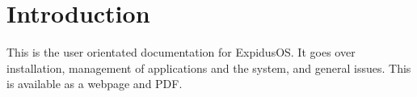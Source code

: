 \documentclass[../main.tex]{subfiles}
\begin{document}
	\section{Introduction}
	\label{sec:intro}

	This is the user orientated documentation for ExpidusOS. It goes over installation, management of applications and the system, and general issues. This is available as a webpage and PDF.
\end{document}

